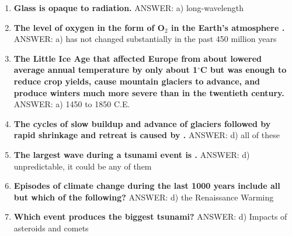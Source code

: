 \documentclass[10pt]{article}
\newcommand{\Rivpt}{\rule{.1pt}{1pt}}
\begin{document}
\begin{enumerate}
{\begin{samepage}
\end{samepage}
}
\item {
\setlength{\itemsep}{0cm}
\setlength{\parskip}{.2cm}
\begin{samepage}
\textbf{
Glass is opaque to \makebox[1cm]{\Rivpt\hrulefill\Rivpt} radiation.
}
ANSWER: a) long-wavelength
\end{samepage}
}
\item {
\setlength{\itemsep}{0cm}
\setlength{\parskip}{.2cm}
\begin{samepage}
\textbf{
The level of oxygen in the form of O\ensuremath{_2} in the Earth's atmosphere \makebox[1cm]{\Rivpt\hrulefill\Rivpt}.
}
ANSWER: a) has not changed substantially in the past 450 million years
\end{samepage}
}
\item {
\setlength{\itemsep}{0cm}
\setlength{\parskip}{.2cm}
\begin{samepage}
\textbf{
The Little Ice Age that affected Europe from about \makebox[1cm]{\Rivpt\hrulefill\Rivpt} lowered average annual temperature by only about 1\ensuremath{^\circ}C but was enough to reduce crop yields, cause mountain glaciers to advance, and produce winters much more severe than in the twentieth century.
}
ANSWER: a) 1450 to 1850 C.E.
\end{samepage}
}
\item {
\setlength{\itemsep}{0cm}
\setlength{\parskip}{.2cm}
\begin{samepage}
\textbf{
The cycles of slow buildup and advance of glaciers followed by rapid shrinkage and retreat is caused by \makebox[1cm]{\Rivpt\hrulefill\Rivpt}.
}
ANSWER: d) all of these
\end{samepage}
}
\item {
\setlength{\itemsep}{0cm}
\setlength{\parskip}{.2cm}
\begin{samepage}
\textbf{
The largest wave during a tsunami event is \makebox[1cm]{\Rivpt\hrulefill\Rivpt}.
}
ANSWER: d)	unpredictable, it could be any of them
\end{samepage}
}
\item {
\setlength{\itemsep}{0cm}
\setlength{\parskip}{.2cm}
\begin{samepage}
\textbf{
Episodes of climate change during the last 1000 years include all but which of the following?
}
ANSWER: d) the Renaissance Warming
\end{samepage}
}
\item {
\setlength{\itemsep}{0cm}
\setlength{\parskip}{.2cm}
\begin{samepage}
\textbf{
Which event produces the biggest tsunami?
}
ANSWER: d)	Impacts of asteroids and comets
\end{samepage}
}
\end{enumerate}
\end{document}
